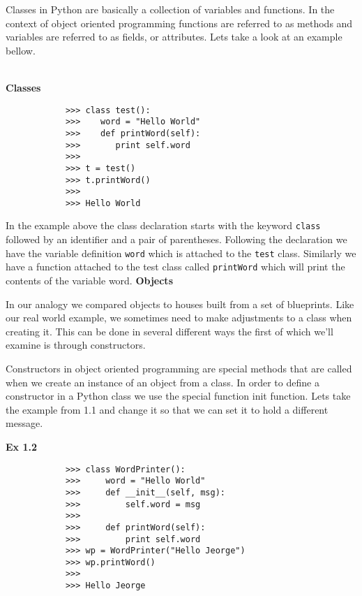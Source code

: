 \documentclass[letterpaper,11pt]{article}
\begin{document}
\par{Classes in Python are basically a collection of variables and functions. In
the context of object oriented programming functions are referred to as methods
and variables are referred to as fields, or attributes. Lets take a look at an
example bellow.}
\\ \\
\begin{minipage}{.5\textwidth}
    \small \textbf{Classes}
    \begin{tcolorbox}
        \begin{footnotesize}
            \begin{verbatim}
            >>> class test():
            >>>    word = "Hello World"
            >>>    def printWord(self):
            >>>       print self.word
            >>>
            >>> t = test()
            >>> t.printWord()
            >>>
            >>> Hello World
            \end{verbatim}
        \end{footnotesize}
    \end{tcolorbox}
\end{minipage}
\par{In the example above the class declaration starts with the keyword
\texttt{class} followed by an identifier and a pair of parentheses. Following
the declaration we have the variable definition \texttt{word} which is
attached to the \texttt{test} class. Similarly we have a function attached to the
test class called \texttt{printWord} which will print the contents of the
variable word.}
\textbf{Objects}
\par{In our analogy we compared objects to houses built from a set of
blueprints.  Like our real world example, we sometimes need to make adjustments
to a class when creating it. This can be done in several different ways the
first of which we'll examine is through constructors.} 
\par{Constructors in object oriented programming are special methods that are
    called when we create an instance of an object from a class. In order to
    define a constructor in a Python class we use the special function init
    function.  Lets take the example from 1.1 and change it so that we can set
it to hold a different message.}
\\
\begin{minipage}{.5\textwidth}
    \small \textbf{Ex 1.2}
    \begin{tcolorbox}
        \begin{footnotesize}
            \begin{verbatim}
            >>> class WordPrinter():
            >>>     word = "Hello World"
            >>>     def __init__(self, msg):
            >>>         self.word = msg
            >>>
            >>>     def printWord(self):
            >>>         print self.word
            >>> wp = WordPrinter("Hello Jeorge") 
            >>> wp.printWord()
            >>>
            >>> Hello Jeorge
            \end{verbatim}
        \end{footnotesize}
    \end{tcolorbox}
\end{minipage}
\end{document}
